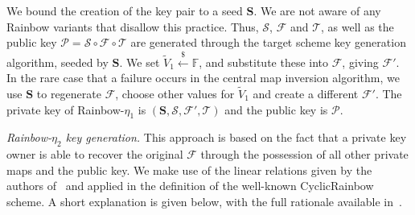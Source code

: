\documentclass[openright]{report}
\newcommand{\random}{\stackrel{\$}{\longleftarrow}}
\begin{document}
We bound the creation of the key pair to a seed $\mathbf{S}$. We are not aware
of any Rainbow variants that disallow this practice. Thus, $\mathcal{S}$,
$\mathcal{F}$ and $\mathcal{T}$, as well as the public key
$\mathcal{P} = \mathcal{S} \circ \mathcal{F} \circ \mathcal{T}$ are generated
through the target scheme key generation algorithm, seeded by $\mathbf{S}$. We
set $\widetilde{V}_{1} \random{} \mathbb{F}$, and substitute these into
$\mathcal{F}$, giving $\mathcal{F}'$. In the rare case that a
failure occurs in the central map inversion algorithm, we use $\mathbf{S}$ to
regenerate $\mathcal{F}$, choose other values for $\widetilde{V}_{1}$ and
create a different $\mathcal{F}'$. The private key of Rainbow-$\eta_{1}$ is
$(\mathbf{S}, \mathcal{S}, \mathcal{F}', \mathcal{T})$ and the public key is
$\mathcal{P}$.

\emph{Rainbow-$\eta_{2}$ key generation.}
This approach is based on the fact that a private key owner is able to recover
the original $\mathcal{F}$ through the possession of all other private maps and
the public key. We make use of the linear relations given by the authors
of~\cite{Petzoldt:201006:inproc} and applied in the definition of the
well-known CyclicRainbow scheme. A short explanation is given below, with the
full rationale available in~\cite[Chapter 7]{Petzoldt:201307:phd}.
\end{document}
